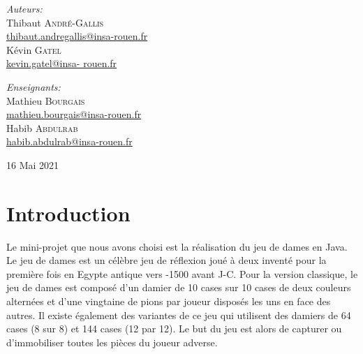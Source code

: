 \documentclass[12,french]{report}
\begin{document}
\begin{titlepage}
\begin{center}
	\begin{minipage}{0.4\textwidth}
		\begin{flushleft} \large
			\emph{Auteurs:}\\
			Thibaut \textsc{André-Gallis} \\
			{\small\href{mailto:thibaut.andregallis@insa-rouen.fr}{thibaut.andregallis@insa-rouen.fr}} \\
			Kévin \textsc{Gatel} \\
			{\small\href{mailto:kevin.gatel@insa-rouen.fr}{kevin.gatel@insa-				rouen.fr}}
		\end{flushleft}
	\end{minipage}
	\begin{minipage}{0.4\textwidth}
		\begin{flushright} \large
			\emph{Enseignants:} \\
			Mathieu \textsc{Bourgais} \\
			{\small\href{mailto:mathieu.bourgais@insa-rouen.fr}								{mathieu.bourgais@insa-rouen.fr}}\\
			Habib \textsc{Abdulrab} \\
			{\small\href{mailto:habib.abdulrab@insa-rouen.fr}{habib.abdulrab@insa-rouen.fr}}
		\end{flushright}
	\end{minipage}

	\vfill
	{\large 16 Mai 2021}
\end{center}
\end{titlepage}

\tableofcontents


\renewcommand{\chaptername}{}
\chapter*{Introduction}

Le mini-projet que nous avons choisi est la réalisation du jeu de dames en Java.\\

Le jeu de dames est un célèbre jeu de réflexion joué à deux inventé pour la première fois en Egypte antique vers -1500 avant J-C.
Pour la version classique, le jeu de dames est composé d'un damier de 10 cases sur 10 cases de deux couleurs alternées et d'une vingtaine de pions par joueur disposés les uns en face des autres. Il existe également des variantes de ce jeu qui utilisent des damiers de 64 cases (8 sur 8) et 144 cases (12 par 12). 
Le but du jeu est alors de capturer ou d'immobiliser toutes les pièces du joueur adverse. \\
\end{document}
